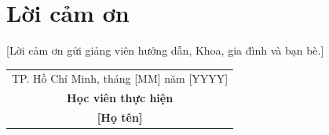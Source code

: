 \chapter*{Lời cảm ơn}

\onehalfspacing
\vspace{1.0cm}

[Lời cảm ơn gửi giảng viên hướng dẫn, Khoa, gia đình và bạn bè.] \par

\begin{flushright}
\begin{tabular}{@{}c@{}}
    TP. Hồ Chí Minh, tháng [MM] năm [YYYY]\\
    \textbf{Học viên thực hiện}\\ [2cm]
    \textbf{[Họ tên]}
\end{tabular}
\end{flushright}

\bigskip
